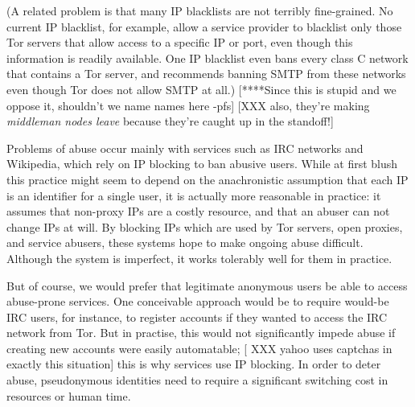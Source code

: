 \documentclass{llncs}
\begin{document}
(A related problem is that many IP blacklists are not terribly fine-grained.
No current IP blacklist, for example, allow a service provider to blacklist
only those Tor servers that allow access to a specific IP or port, even
though this information is readily available.  One IP blacklist even bans
every class C network that contains a Tor server, and recommends banning SMTP
from these networks even though Tor does not allow SMTP at all.)
[****Since this is stupid and we oppose it, shouldn't we name names here -pfs]
[XXX also, they're making \emph{middleman nodes leave} because they're caught
 up in the standoff!]

Problems of abuse occur mainly with services such as IRC networks and
Wikipedia, which rely on IP blocking to ban abusive users.  While at first
blush this practice might seem to depend on the anachronistic assumption that
each IP is an identifier for a single user, it is actually more reasonable in
practice: it assumes that non-proxy IPs are a costly resource, and that an
abuser can not change IPs at will.  By blocking IPs which are used by Tor
servers, open proxies, and service abusers, these systems hope to make
ongoing abuse difficult.  Although the system is imperfect, it works
tolerably well for them in practice.

But of course, we would prefer that legitimate anonymous users be able to
access abuse-prone services.  One conceivable approach would be to require
would-be IRC users, for instance, to register accounts if they wanted to
access the IRC network from Tor.  But in practise, this would not
significantly impede abuse if creating new accounts were easily automatable;
[ XXX yahoo uses captchas in exactly this situation]
this is why services use IP blocking.  In order to deter abuse, pseudonymous
identities need to require a significant switching cost in resources or human
time.
\end{document}
